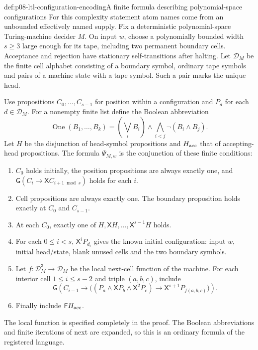 \begin{hbdefinition}{def:p08-ltl-configuration-encoding}{A finite formula describing polynomial-space configurations}
For this complexity statement atom names come from an unbounded
effectively named supply. Fix a deterministic polynomial-space
Turing-machine decider \(M\). On input \(w\), choose a
polynomially bounded width \(s\geq3\) large enough for its
tape, including two permanent boundary cells. Acceptance and
rejection have stationary self-transitions after halting.
Let \(\mathcal D_M\) be the finite cell alphabet consisting of a
boundary symbol, ordinary tape symbols and pairs of a machine
state with a tape symbol. Such a pair marks the unique head.

Use propositions \(C_0,\ldots,C_{s-1}\) for position within
a configuration and \(P_d\) for each \(d\in\mathcal D_M\).
For a nonempty finite list define the Boolean abbreviation
\[
 \operatorname{One}(B_1,\ldots,B_k)=
 (\bigvee_i B_i)\land
 \bigwedge_{i<j}\neg(B_i\land B_j).
\]
Let \(H\) be the disjunction of head-symbol propositions and
\(H_{\rm acc}\) that of accepting-head propositions. The
formula \(\Psi_{M,w}\) is the conjunction of these finite conditions:
\begin{enumerate}
\item \(C_0\) holds initially, the position propositions are
      always exactly one, and
      \(\mathsf G(C_i\to\mathsf XC_{i+1\bmod s})\)
      holds for each \(i\).
\item Cell propositions are always exactly one. The boundary
      proposition holds exactly at \(C_0\) and \(C_{s-1}\).
\item At each \(C_0\), exactly one of
      \(H,\mathsf XH,\ldots,\mathsf X^{s-1}H\) holds.
\item For each \(0\leq i<s\),
      \(\mathsf X^iP_{d_i}\) gives the known initial
      configuration: input \(w\), initial head/state, blank
      unused cells and the two boundary symbols.
\item Let \(f:\mathcal D_M^3\to\mathcal D_M\) be the local next-cell
      function of the machine. For each interior cell
      \(1\leq i\leq s-2\) and triple \((a,b,c)\), include
      \[
       \mathsf G\left(C_{i-1}\to
       \bigl((P_a\land\mathsf XP_b\land\mathsf X^2P_c)
                  \to\mathsf X^{s+1}P_{f(a,b,c)}\bigr)\right).
      \]
\item Finally include \(\mathsf F H_{\rm acc}\).
\end{enumerate}
The local function is specified completely in the proof. The
Boolean abbreviations and finite iterations of next are expanded,
so this is an ordinary formula of the registered language.
\end{hbdefinition}

